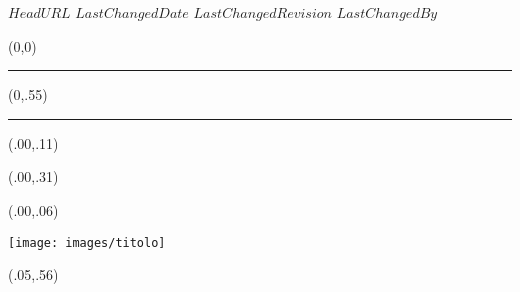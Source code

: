 \svnidlong
{$HeadURL$}
{$LastChangedDate$}
{$LastChangedRevision$}
{$LastChangedBy$}

\thispagestyle{empty}
\addtocounter{page}{-1}

\begin{textblock}{1}(0,0)
	\noindent\textcolor{orangeill}{\rule{\paperwidth}{.55\paperheight}}
\end{textblock}


\begin{textblock}{1}(0,.55)
	\noindent\textcolor{black}{\rule{\paperwidth}{.45\paperheight}}
\end{textblock}


\begin{textblock}{1}(.00,.11)
\end{textblock}

\begin{textblock}{1}(.00,.31)
\end{textblock}


\begin{textblock}{1}(.00,.06)
	\begin{center}
	\texttt{[image: images/titolo]}
	\end{center}
\end{textblock}



\begin{textblock}{.9}(.05,.56)
	\begin{flushright}
		\noindent {\fontsize{20.74}{2}\selectfont
			\bfseries\textcolor{white}{Manualozzo\texttrademark\  di Fisica 2}}
	\end{flushright}
\end{textblock}


